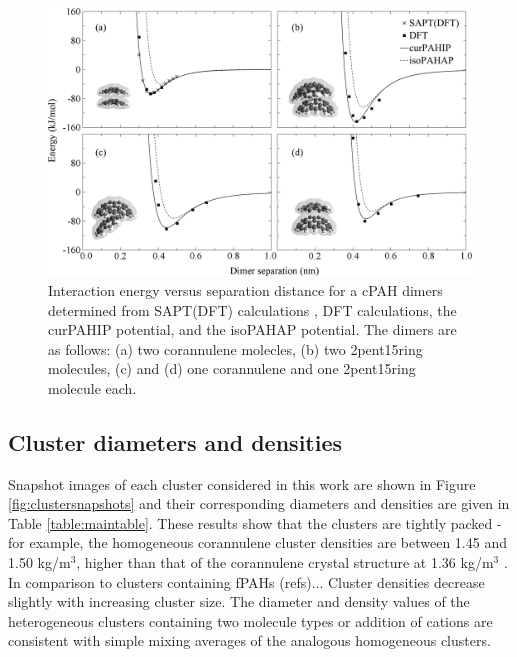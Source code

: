 \begin{figure}[!tbh]
\centering
\includegraphics[width=1\linewidth]{Figures/potentialDFT_curves.eps}
\caption{Interaction energy versus separation distance for a cPAH dimers determined from SAPT(DFT) calculations \cite{Cabaleiro-Lago2018}, DFT calculations, the curPAHIP potential, and the isoPAHAP potential. The dimers are as follows: (a) two corannulene molecles, (b) two 2pent15ring molecules, (c) and (d) one corannulene and one 2pent15ring molecule each.}
\label{fig:potentialDFTcurves}
\end{figure}
%

\subsection{Cluster diameters and densities}

Snapshot images of each cluster considered in this work are shown in Figure \ref{fig:clustersnapshots} and their corresponding diameters and densities are given in Table \ref{table:maintable}.  %
These results show that the clusters are tightly packed - for example, the homogeneous corannulene cluster densities are between 1.45 and 1.50 kg/$\text{m}^{3}$, higher than that of the corannulene crystal structure at 1.36 kg/$\text{m}^{3}$ \cite{CORANN11unitcell}. In comparison to clusters containing fPAHs (refs)... %
Cluster densities decrease slightly with increasing cluster size.
The diameter and density values of the heterogeneous clusters containing two molecule types or addition of cations are consistent with simple mixing averages of the analogous homogeneous clusters. %

